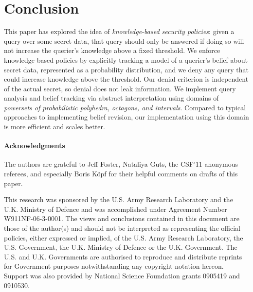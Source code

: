 \documentclass[9pt]{article}
\begin{document}








\section{Conclusion}
\label{sec:conc}

This paper has explored the idea of \emph{knowledge-based security
  policies}: given a query over some secret data, that query should
only be answered if doing so will not increase the querier's knowledge
above a fixed threshold.  We enforce knowledge-based policies by
explicitly tracking a model of a querier's belief about secret data,
represented as a probability distribution, and we deny any query that
could increase knowledge above the threshold.  Our denial criterion is
independent of the actual secret, so denial does not leak information.
We implement query analysis and belief tracking via abstract
interpretation using domains of \emph{powersets of probabilistic
polyhedra, octagons, and intervals}.
%
Compared to typical approaches to implementing belief revision, our
implementation using this domain is more efficient and scales better.

\vspace*{.1in}
\begin{small}
\paragraph*{Acknowledgments} The authors are
grateful to Jeff Foster, Nataliya Guts, the CSF'11 anonymous referees, and
especially Boris K\"opf for their helpful comments on
drafts of this paper.  

This research was sponsored by the U.S. Army
Research Laboratory and the U.K. Ministry of Defence and was
accomplished under Agreement Number W911NF-06-3-0001. The views and
conclusions contained in this document are those of the author(s) and
should not be interpreted as representing the official policies,
either expressed or implied, of the U.S. Army Research Laboratory, the
U.S. Government, the U.K. Ministry of Defence or the
U.K. Government. The U.S. and U.K. Governments are authorised to
reproduce and distribute reprints for Government purposes
notwithstanding any copyright notation hereon.  Support was also
provided by National Science Foundation grants 0905419 and
0910530.
\end{small}


\balance



\end{document}

